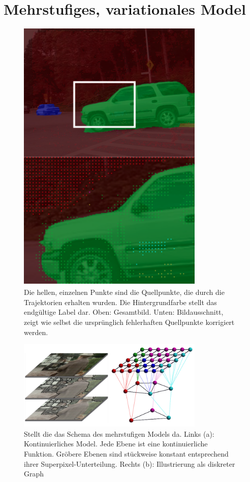 \section{Mehrstufiges, variationales Model}

\begin{figure}[bt]\centering\includegraphics[width=3.5in]{images/close_up_comb.png}
  \caption{Die hellen, einzelnen Punkte sind die Quellpunkte, die durch die Trajektorien erhalten wurden. Die Hintergrundfarbe stellt das endgültige
    Label dar. Oben: Gesamtbild. Unten: Bildausschnitt, zeigt wie selbst die ursprünglich fehlerhaften Quellpunkte korrigiert werden.}
  \label{fig:close}
\end{figure}

\begin{figure}[tb]\centering\includegraphics[width=3.5in]{images/graph.png}
  \caption{Stellt die das Schema des mehrstufigen Models da. Links (a): Kontinuierliches Model. Jede Ebene ist eine kontinuierliche Funktion.
  Gröbere Ebenen sind stückweise konstant entsprechend ihrer Superpixel-Unterteilung. Rechts (b): Illustrierung als diskreter Graph}
  \label{fig:graph}
\end{figure}

